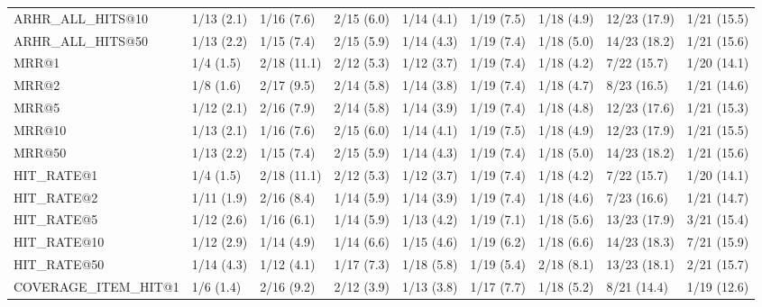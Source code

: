 \begin{tabular}{lllllllll}
ARHR_ALL_HITS@10            &     1/13 (2.1) &     1/16 (7.6) &    2/15 (6.0) &    1/14 (4.1) &  1/19 (7.5) &   1/18 (4.9) &   12/23 (17.9) &        1/21 (15.5) \\
ARHR_ALL_HITS@50            &     1/13 (2.2) &     1/15 (7.4) &    2/15 (5.9) &    1/14 (4.3) &  1/19 (7.4) &   1/18 (5.0) &   14/23 (18.2) &        1/21 (15.6) \\
MRR@1                       &      1/4 (1.5) &    2/18 (11.1) &    2/12 (5.3) &    1/12 (3.7) &  1/19 (7.4) &   1/18 (4.2) &    7/22 (15.7) &        1/20 (14.1) \\
MRR@2                       &      1/8 (1.6) &     2/17 (9.5) &    2/14 (5.8) &    1/14 (3.8) &  1/19 (7.4) &   1/18 (4.7) &    8/23 (16.5) &        1/21 (14.6) \\
MRR@5                       &     1/12 (2.1) &     2/16 (7.9) &    2/14 (5.8) &    1/14 (3.9) &  1/19 (7.4) &   1/18 (4.8) &   12/23 (17.6) &        1/21 (15.3) \\
MRR@10                      &     1/13 (2.1) &     1/16 (7.6) &    2/15 (6.0) &    1/14 (4.1) &  1/19 (7.5) &   1/18 (4.9) &   12/23 (17.9) &        1/21 (15.5) \\
MRR@50                      &     1/13 (2.2) &     1/15 (7.4) &    2/15 (5.9) &    1/14 (4.3) &  1/19 (7.4) &   1/18 (5.0) &   14/23 (18.2) &        1/21 (15.6) \\
HIT_RATE@1                  &      1/4 (1.5) &    2/18 (11.1) &    2/12 (5.3) &    1/12 (3.7) &  1/19 (7.4) &   1/18 (4.2) &    7/22 (15.7) &        1/20 (14.1) \\
HIT_RATE@2                  &     1/11 (1.9) &     2/16 (8.4) &    1/14 (5.9) &    1/14 (3.9) &  1/19 (7.4) &   1/18 (4.6) &    7/23 (16.6) &        1/21 (14.7) \\
HIT_RATE@5                  &     1/12 (2.6) &     1/16 (6.1) &    1/14 (5.9) &    1/13 (4.2) &  1/19 (7.1) &   1/18 (5.6) &   13/23 (17.9) &        3/21 (15.4) \\
HIT_RATE@10                 &     1/12 (2.9) &     1/14 (4.9) &    1/14 (6.6) &    1/15 (4.6) &  1/19 (6.2) &   1/18 (6.6) &   14/23 (18.3) &        7/21 (15.9) \\
HIT_RATE@50                 &     1/14 (4.3) &     1/12 (4.1) &    1/17 (7.3) &    1/18 (5.8) &  1/19 (5.4) &   2/18 (8.1) &   13/23 (18.1) &        2/21 (15.7) \\
COVERAGE_ITEM_HIT@1         &      1/6 (1.4) &     2/16 (9.2) &    2/12 (3.9) &    1/13 (3.8) &  1/17 (7.7) &   1/18 (5.2) &    8/21 (14.4) &        1/19 (12.6) \\

\end{tabular}
